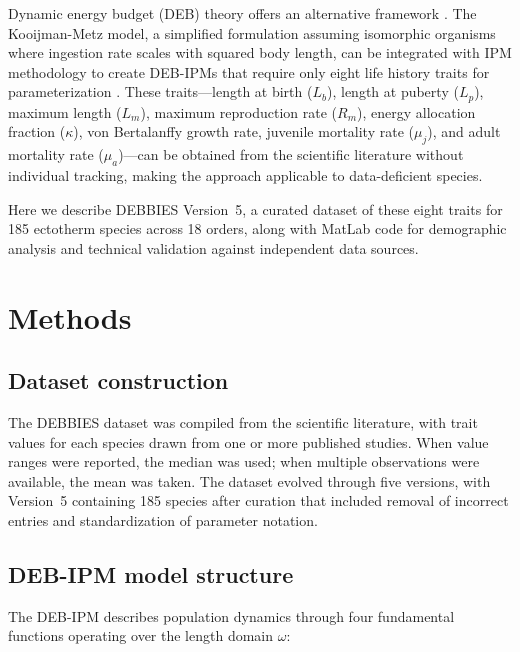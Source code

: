 \documentclass[11pt]{article}
\begin{document}
Dynamic energy budget (DEB) theory offers an alternative framework \citep{kooijman2010dynamic}. The Kooijman-Metz model, a simplified formulation assuming isomorphic organisms where ingestion rate scales with squared body length, can be integrated with IPM methodology to create DEB-IPMs that require only eight life history traits for parameterization \citep{nisbet2000organism}. These traits---length at birth ($L_b$), length at puberty ($L_p$), maximum length ($L_m$), maximum reproduction rate ($R_m$), energy allocation fraction ($\kappa$), von Bertalanffy growth rate, juvenile mortality rate ($\mu_j$), and adult mortality rate ($\mu_a$)---can be obtained from the scientific literature without individual tracking, making the approach applicable to data-deficient species.

Here we describe DEBBIES Version~5, a curated dataset of these eight traits for 185 ectotherm species across 18 orders, along with MatLab code for demographic analysis and technical validation against independent data sources.

\section{Methods}

\subsection{Dataset construction}

The DEBBIES dataset was compiled from the scientific literature, with trait values for each species drawn from one or more published studies. When value ranges were reported, the median was used; when multiple observations were available, the mean was taken. The dataset evolved through five versions, with Version~5 containing 185 species after curation that included removal of incorrect entries and standardization of parameter notation.

\subsection{DEB-IPM model structure}

The DEB-IPM describes population dynamics through four fundamental functions operating over the length domain $\omega$:
\end{document}
